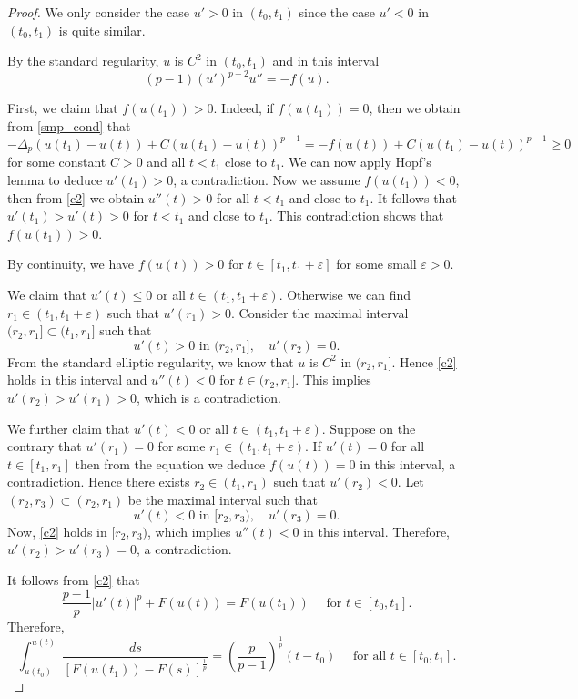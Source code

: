 \documentclass[reqno]{amsart}
\theoremstyle{plain}
\theoremstyle{definition}
\theoremstyle{remark}
\begin{document}
	\begin{proof}
		We only consider the case $u' > 0$ in $(t_0, t_1)$ since the case $u' < 0$ in $(t_0, t_1)$ is quite similar.
		
		By the standard regularity, $u$ is $C^2$ in $(t_0, t_1)$ and in this interval
		\begin{equation}\label{c2}
			(p-1)(u')^{p-2}u'' = -f(u).
		\end{equation}
		
		First, we claim that $f(u(t_1)) > 0$. Indeed, if $f(u(t_1)) = 0$, then we obtain from \eqref{smp_cond} that
		\[
		-\Delta_p(u(t_1)-u(t)) + C(u(t_1)-u(t))^{p-1} = -f(u(t)) + C(u(t_1)-u(t))^{p-1} \ge 0
		\]
		for some constant $C>0$ and all $t < t_1$ close to $t_1$. We can now apply Hopf's lemma \cite{MR768629} to deduce $u'(t_1)>0$, a contradiction. Now we assume $f(u(t_1)) < 0$, then from \eqref{c2} we obtain $u''(t) > 0$ for all $t < t_1$ and close to $t_1$. It follows that $u'(t_1) > u'(t) > 0$ for $t < t_1$ and close to $t_1$. This contradiction shows that $f(u(t_1)) > 0$.
		
		By continuity, we have $f(u(t)) > 0$ for $t\in[t_1,t_1+\varepsilon]$ for some small $\varepsilon>0$.
		
		We claim that $u'(t)\le0$ or all $t\in(t_1,t_1+\varepsilon)$. Otherwise we can find $r_1\in(t_1,t_1+\varepsilon)$ such that $u'(r_1) > 0$. Consider the maximal interval $(r_2,r_1]\subset(t_1,r_1]$ such that
		\[
		u'(t)>0 \text{ in } (r_2,r_1], \quad u'(r_2)=0.
		\]
		From the standard elliptic regularity, we know that $u$ is $C^2$ in $(r_2,r_1]$. Hence \eqref{c2} holds in this interval and $u''(t)<0$ for $t\in(r_2,r_1]$. This implies $u'(r_2)>u'(r_1)>0$, which is a contradiction.
		
		We further claim that $u'(t)<0$ or all $t\in(t_1,t_1+\varepsilon)$. Suppose on the contrary that $u'(r_1) = 0$ for some $r_1\in(t_1,t_1+\varepsilon)$. If $u'(t) = 0$ for all $t\in[t_1,r_1]$ then from the equation we deduce $f(u(t)) = 0$ in this interval, a contradiction. Hence there exists $r_2\in(t_1,r_1)$ such that $u'(r_2) < 0$. Let $(r_2,r_3)\subset(r_2,r_1)$ be the maximal interval such that
		\[
		u'(t)<0 \text{ in } [r_2,r_3), \quad u'(r_3)=0.
		\]
		Now, \eqref{c2} holds in $[r_2,r_3)$, which implies $u''(t)<0$ in this interval. Therefore, $u'(r_2)>u'(r_3)=0$, a contradiction.
		
		It follows from \eqref{c2} that
		\begin{equation}\label{p-Laplace-integral}
			\frac{p-1}{p} |u'(t)|^p + F(u(t)) = F(u(t_1)) \quad\text{ for } t\in[t_0,t_1].
		\end{equation}		
		Therefore,
		\begin{equation}\label{unique}
			\int_{u(t_0)}^{u(t)} \frac{ds}{\left[F(u(t_1))-F(s)\right]^\frac{1}{p}} = \left(\frac{p}{p-1}\right)^\frac{1}{p}(t-t_0) \quad\text{ for all } t\in[t_0,t_1].
		\end{equation}
		

\end{proof}
\end{document}
